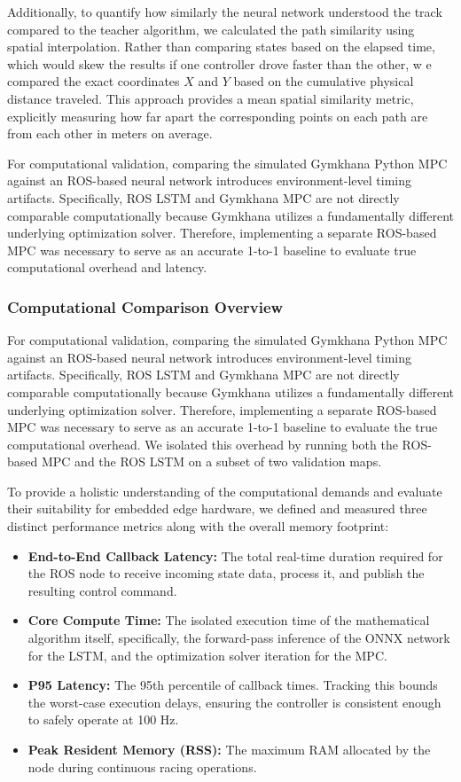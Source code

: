 \documentclass[conference]{IEEEtran}
\begin{document}
Additionally, to quantify how similarly the neural network understood the track compared to the teacher algorithm, we calculated the path similarity using spatial interpolation. Rather than comparing states based on the elapsed time, which would skew the results if one controller drove faster than the other, w e compared the exact coordinates $X$ and $Y$ based on the cumulative physical distance traveled. This approach provides a mean spatial similarity metric, explicitly measuring how far apart the corresponding points on each path are from each other in meters on average.

For computational validation, comparing the simulated Gymkhana Python MPC against an ROS-based neural network introduces environment-level timing artifacts. Specifically, ROS LSTM and Gymkhana MPC are not directly comparable computationally because Gymkhana utilizes a fundamentally different underlying optimization solver. Therefore, implementing a separate ROS-based MPC was necessary to serve as an accurate 1-to-1 baseline to evaluate true computational overhead and latency.

\subsubsection{Computational Comparison Overview}

For computational validation, comparing the simulated Gymkhana Python MPC against an ROS-based neural network introduces environment-level timing artifacts. Specifically, ROS LSTM and Gymkhana MPC are not directly comparable computationally because Gymkhana utilizes a fundamentally different underlying optimization solver. Therefore, implementing a separate ROS-based MPC was necessary to serve as an accurate 1-to-1 baseline to evaluate the true computational overhead. We isolated this overhead by running both the ROS-based MPC and the ROS LSTM on a subset of two validation maps. 

To provide a holistic understanding of the computational demands and evaluate their suitability for embedded edge hardware, we defined and measured three distinct performance metrics along with the overall memory footprint:

\begin{itemize}
    \item \textbf{End-to-End Callback Latency:} The total real-time duration required for the ROS node to receive incoming state data, process it, and publish the resulting control command.
    \item \textbf{Core Compute Time:} The isolated execution time of the mathematical algorithm itself, specifically, the forward-pass inference of the ONNX network for the LSTM, and the optimization solver iteration for the MPC. 
    \item \textbf{P95 Latency:} The 95th percentile of callback times. Tracking this bounds the worst-case execution delays, ensuring the controller is consistent enough to safely operate at 100 Hz.
    \item \textbf{Peak Resident Memory (RSS):} The maximum RAM allocated by the node during continuous racing operations.
\end{itemize}
\end{document}
